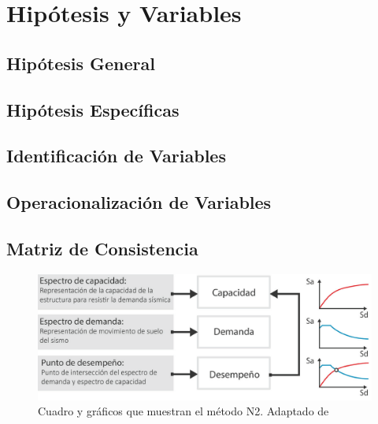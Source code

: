 \section{Hipótesis y Variables}

\subsection{Hipótesis General}

\subsection{Hipótesis Específicas}

\subsection{Identificación de Variables}

\subsection{Operacionalización de Variables}

\subsection{Matriz de Consistencia}

\lipsum[17]

\lipsum[18]

\begin{figure}[!ht]
	\centering
  \includegraphics[scale=0.36]{E_IMAGENES/3_Capitulo3/Cap3_Imagen70.png}
	\caption{\centering\footnotesize Cuadro y gráficos que muestran el método N2. Adaptado de \cite{deWaal2009}}
	\label{Cap3_Figura3}
\end{figure}

\lipsum[19]